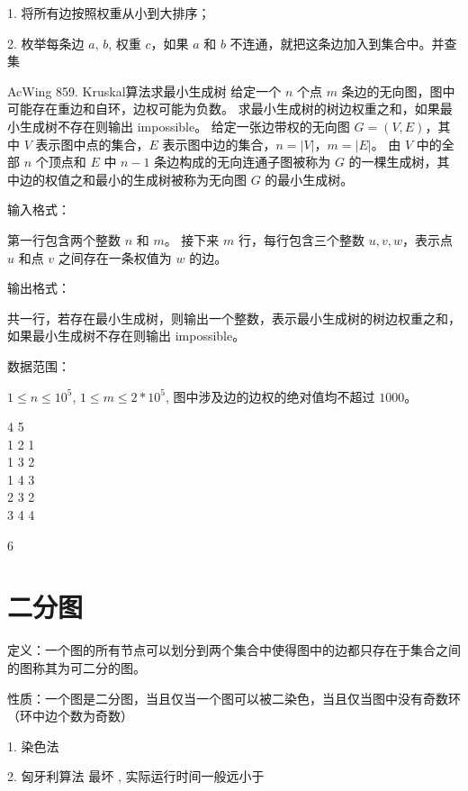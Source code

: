 1. 将所有边按照权重从小到大排序；

2. 枚举每条边 $a$, $b$, 权重 $c$，如果 $a$ 和 $b$ 不连通，就把这条边加入到集合中。并查集


\begin{titledbox}{AcWing 859. Kruskal算法求最小生成树}
    给定一个 $n$ 个点 $m$ 条边的无向图，图中可能存在重边和自环，边权可能为负数。 求最小生成树的树边权重之和，如果最小生成树不存在则输出 impossible。 给定一张边带权的无向图 $G=(V, E)$，其中 $V$ 表示图中点的集合，$E$ 表示图中边的集合，$n=|V|$，$m=|E|$。 由 $V$ 中的全部 $n$ 个顶点和 $E$ 中 $n-1$ 条边构成的无向连通子图被称为 $G$ 的一棵生成树，其中边的权值之和最小的生成树被称为无向图 $G$ 的最小生成树。

    输入格式：

    第一行包含两个整数 $n$ 和 $m$。 接下来 $m$ 行，每行包含三个整数 $u,v,w$，表示点 $u$ 和点 $v$ 之间存在一条权值为 $w$ 的边。

    输出格式：

    共一行，若存在最小生成树，则输出一个整数，表示最小生成树的树边权重之和，如果最小生成树不存在则输出 impossible。

    数据范围：

    $1 \le n \le 10^5$, $1 \le m \le 2*10^5$, 图中涉及边的边权的绝对值均不超过 $1000$。

    \begin{inputblock}
        4 5 \\
        1 2 1 \\
        1 3 2 \\
        1 4 3 \\
        2 3 2 \\
        3 4 4
    \end{inputblock}
    \begin{outputblock}
        6
    \end{outputblock}
\end{titledbox}


\section{二分图}

定义：一个图的所有节点可以划分到两个集合中使得图中的边都只存在于集合之间的图称其为可二分的图。

性质：一个图是二分图，当且仅当一个图可以被二染色，当且仅当图中没有奇数环（环中边个数为奇数）

1. 染色法 

2. 匈牙利算法 最坏 , 实际运行时间一般远小于 

